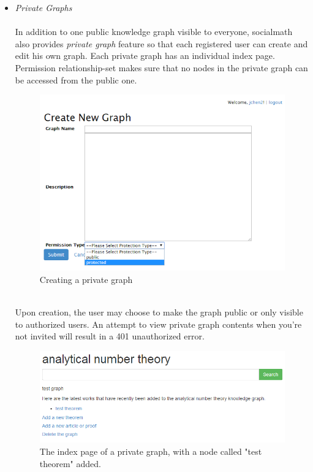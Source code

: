 \documentclass{acm_proc_article-sp}
\begin{document}
\begin{itemize}
\item \emph{Private Graphs} \\\\
In addition to one public knowledge graph visible to everyone, socialmath also provides \emph{private graph} feature so that each registered user can create and edit his own graph. Each private graph has an individual index page. Permission relationship-set makes sure that no nodes in the private graph can be accessed from the public one.   \begin{figure}[h!]
\centering
\includegraphics[scale=0.4]{create_pg.png}
\caption{Creating a private graph}
\end{figure}\\
Upon creation, the user may choose to make the graph public or only visible to authorized users. An attempt to view private graph contents when you're not invited will result in a 401 unauthorized error. 
\begin{figure}[h!]
\centering
\includegraphics[scale=0.4]{pg_index.png}
\caption{The index page of a private graph, with a node called "test theorem" added.}
\end{figure}\\

\end{itemize}
\end{document}
